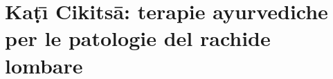 \documentclass[a4paper, openright, twoside, 12pt]{book}
\begin{document}


\part{Ka\d{t}\={\i} Cikits\={a}: terapie ayurvediche per le patologie del rachide lombare}
































\end{document}
